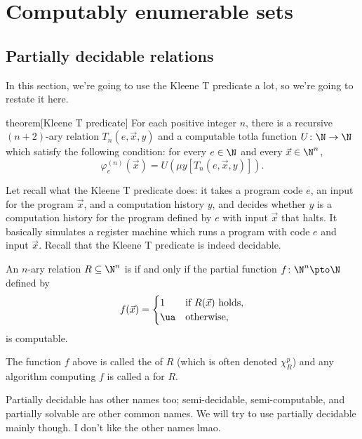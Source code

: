 \documentclass[class=article, crop=false]{standalone}
\begin{document}
\section{Computably enumerable sets}

\subsection{Partially decidable relations}

In this section, we're going to use the Kleene T predicate a lot, so we're going to restate it here.

\begin{result}{theorem}[Kleene T predicate]
  For each positive integer $n$, there is a recursive $(n+2)$-ary relation $T_n(e, \vec x,y)$ and a computable totla function $U\colon \N \to \N$ which satisfy the following condition: for every $e \in \N$ and every $\vec x \in \N^n$,
    \[
      \varphi_e^{(n)} (\vec x) = U(\mu y[T_n(e, \vec x, y)]).
    \]
\end{result}
\begin{rem}
  Let recall what the Kleene T predicate does: it takes a program code $e$, an input for the program $\vec x$, and a computation history $y$, and decides whether $y$ is a computation history for the program defined by $e$ with input $\vec x$ that halts. It basically simulates a register machine which runs a program with code $e$ and input $\vec x$. Recall that the Kleene T predicate is indeed decidable.
\end{rem}

\begin{defn}
  An $n$-ary relation $R \subseteq \N^n$ is  if and only if the partial function $f\colon \N^n \pto \N$ defined by
    \[
      f(\vec x) =
        \begin{cases}
          1 &\text{if } R(\vec x) \text{ holds}, \\
          \ua &\text{otherwise},
        \end{cases}
    \]
  is computable.

  The function $f$ above is called the  of $R$ (which is often denoted $\chi_R^p$) and any algorithm computing $f$ is called a  for $R$.
\end{defn}
\begin{rem}
  Partially decidable has other names too; semi-decidable, semi-computable, and partially solvable are other common names. We will try to use partially decidable mainly though. I don't like the other names lmao.
\end{rem}
\end{document}
